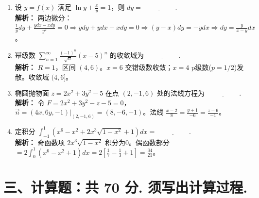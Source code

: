 \documentclass[10pt, a3paper, landscape, twocolumn]{article}
\begin{document}
\begin{enumerate}[start=13]
    \item 设 $y = f(x)$ 满足 $\ln y + \frac{x}{y} = 1$，则 $dy = \underline{\hspace{2cm}}$. \\
    {\color{red} \footnotesize \textbf{解析：} 两边微分：$\frac{1}{y}dy + \frac{y dx - x dy}{y^2} = 0 \Rightarrow y dy + y dx - x dy = 0 \Rightarrow (y-x)dy = -y dx \Rightarrow dy = \frac{y}{x-y}dx$。}
    
    \item 幂级数 $\sum\limits_{n=1}^\infty \frac{(-1)^n}{\sqrt{n}}(x-5)^n$ 的收敛域为 $\underline{\hspace{2cm}}$. \\
    {\color{red} \footnotesize \textbf{解析：} $R=1$，区间 $(4,6)$。$x=6$ 交错级数收敛；$x=4$ p级数($p=1/2$)发散。收敛域 $(4,6]$。}
    
    \item 椭圆抛物面 $z = 2x^2 + 3y^2 - 5$ 在点 $(2,-1,6)$ 处的法线方程为 $\underline{\hspace{2cm}}$. \\
    {\color{red} \footnotesize \textbf{解析：} 令 $F=2x^2+3y^2-z-5=0$，$\vec{n}=(4x,6y,-1)|_{(2,-1,6)} = (8,-6,-1)$。法线 $\frac{x-2}{8}=\frac{y+1}{-6}=\frac{z-6}{-1}$。}
    
    \item 定积分 $\int_{-1}^{1} (x^6 - x^2 + 2x^3\sqrt{1-x^2} + 1) dx = \underline{\hspace{2cm}}$. \\
    {\color{red} \footnotesize \textbf{解析：} 奇函数项 $2x^3\sqrt{1-x^2}$ 积分为0。偶函数部分 $= 2\int_0^1(x^6-x^2+1)dx = 2[\frac{1}{7}-\frac{1}{3}+1] = \frac{34}{21}$。}
\end{enumerate}

\newpage 

\section*{三、计算题：共 70 分. 须写出计算过程.}
\end{document}
